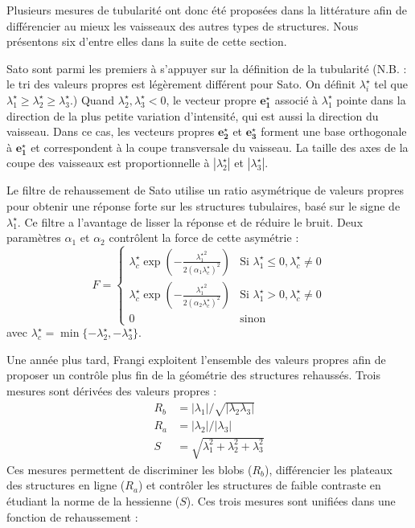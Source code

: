 Plusieurs mesures de tubularité ont donc été proposées dans la littérature afin de différencier au mieux les vaisseaux des autres types de structures. Nous présentons six d'entre elles dans la suite de cette section.


Sato \etal \cite{Sato1998_vesselness} sont parmi les premiers à s'appuyer sur la définition de la tubularité  (N.B. : le tri des valeurs propres est légèrement différent pour Sato. On définit $\lambda^\star_i$ tel que $\lambda^\star_1 \geqslant \lambda^\star_2  \geqslant  \lambda^\star_3$.)
Quand $\lambda^\star_2, \lambda^\star_3 < 0$, le vecteur propre $\mathbf {e^\star_1}$ associé à $\lambda^\star_1$ pointe dans la direction de la plus petite variation d'intensité, qui est aussi la direction du vaisseau.
Dans ce cas, les vecteurs propres $\mathbf {e^\star_2}$ et $\mathbf {e^\star_3}$ forment une base orthogonale à $\mathbf {e^\star_1}$ et correspondent à la coupe transversale du vaisseau.
La taille des axes de la coupe des vaisseaux est proportionnelle à $|\lambda^\star_2|$ et $|\lambda^\star_3|$.

Le filtre de rehaussement de Sato utilise un ratio asymétrique de valeurs propres pour obtenir une réponse forte sur les structures tubulaires, basé sur le signe de $\lambda^\star_1$.
Ce filtre a l'avantage de lisser la réponse et de réduire le bruit. Deux paramètres $\alpha_1$ et $\alpha_2$ contrôlent la force de cette asymétrie :
\begin{equation}
\nonumber
F =
\left\{
\begin{array}{ll}
\lambda^\star_c \exp(-\frac{{\lambda^\star_1}^2}{2(\alpha_1 \lambda^\star_c)^2})  & 
\textrm{Si } \lambda^\star_1 \leqslant 0, \lambda^\star_c \neq 0 \\
\lambda^\star_c \exp(-\frac{{\lambda^\star_1}^2}{2(\alpha_2\lambda^\star_c)^2})  &  
\textrm{Si } \lambda^\star_1 > 0, \lambda^\star_c \neq 0 \\
0 & \textrm{sinon}
\end{array}
\right.
\end{equation}
avec $\lambda^\star_c = \min\{-\lambda^\star_2,-\lambda^\star_3\}$.


Une année plus tard, Frangi \etal \cite{Frangi1998_vesselness} exploitent l'ensemble des valeurs propres afin de proposer un contrôle plus fin de la géométrie des structures rehaussés. Trois mesures sont dérivées des valeurs propres :
\begin{align}
 \nonumber
  R_b & = |\lambda_1| / \sqrt{|\lambda_2\lambda_3|}\\
R_a & = |\lambda_2| / |\lambda_3| \nonumber\\
S & = \sqrt{\lambda^2_1 + \lambda^2_2 + \lambda^2_3} \nonumber
\end{align}
Ces mesures permettent de discriminer les blobs ($R_b$), différencier les plateaux des structures en ligne ($R_a$) et contrôler les structures de faible contraste en étudiant la norme de la hessienne ($S$). Ces trois mesures sont unifiées dans une fonction de rehaussement :   

